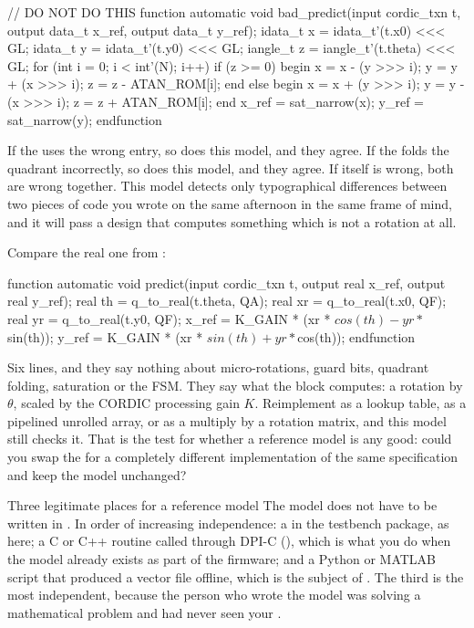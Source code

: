 \begin{svcode}[caption={A worthless reference model: it is the RTL again},label={lst:tb:badmodel}]
// DO NOT DO THIS
function automatic void bad_predict(input cordic_txn t,
                                    output data_t x_ref, output data_t y_ref);
  idata_t  x = idata_t'(t.x0)      <<< GL;
  idata_t  y = idata_t'(t.y0)      <<< GL;
  iangle_t z = iangle_t'(t.theta)  <<< GL;
  for (int i = 0; i < int'(N); i++)
    if (z >= 0) begin
      x = x - (y >>> i);  y = y + (x >>> i);  z = z - ATAN_ROM[i];
    end else begin
      x = x + (y >>> i);  y = y - (x >>> i);  z = z + ATAN_ROM[i];
    end
  x_ref = sat_narrow(x);  y_ref = sat_narrow(y);
endfunction
\end{svcode}

If the \RTL{} uses the wrong  entry, so does this model, and
they agree. If the \RTL{} folds the quadrant incorrectly, so does this model,
and they agree. If  itself is wrong, both are wrong together.
This model detects only typographical differences between two pieces of code
you wrote on the same afternoon in the same frame of mind, and it will pass a
design that computes something which is not a rotation at all.

Compare the real one from :

\begin{svcode}[caption={The reference model from \file{tb\_cordic\_pkg.sv}: pure specification},label={lst:tb:goodmodel}]
function automatic void predict(input cordic_txn t,
                                output real x_ref, output real y_ref);
  real th = q_to_real(t.theta, QA);
  real xr = q_to_real(t.x0,    QF);
  real yr = q_to_real(t.y0,    QF);
  x_ref = K_GAIN * (xr * $cos(th) - yr * $sin(th));
  y_ref = K_GAIN * (xr * $sin(th) + yr * $cos(th));
endfunction
\end{svcode}

Six lines, and they say nothing about micro-rotations, guard bits, quadrant
folding, saturation or the FSM. They say what the block computes: a rotation by
$\theta$, scaled by the CORDIC processing gain $K$. Reimplement
 as a lookup table, as a pipelined unrolled array, or as a
multiply by a rotation matrix, and this model still checks it. That is the test
for whether a reference model is any good: could you swap the \DUT{} for a
completely different implementation of the same specification and keep the
model unchanged?

\begin{notebox}{Three legitimate places for a reference model}
The model does not have to be written in \SV{}. In order of increasing
independence: a  in the testbench package, as here; a C or
C++ routine called through DPI-C (), which is what you
do when the model already exists as part of the firmware; and a Python or
MATLAB script that produced a vector file offline, which is the subject of
. The third is the most independent, because the person who
wrote the model was solving a mathematical problem and had never seen your
\RTL{}.
\end{notebox}

